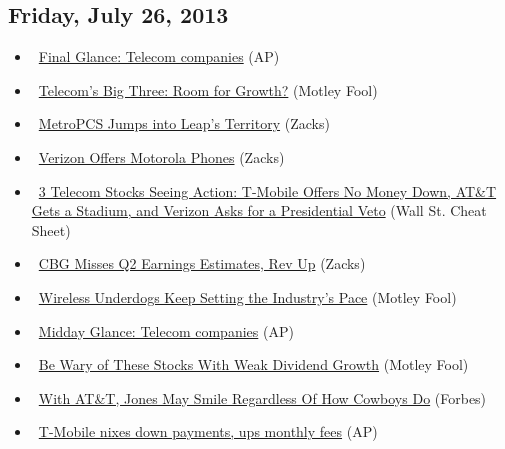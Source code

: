 \documentclass[11pt,asymmetric]{article}
\begin{document}
\subsection*{Friday, July 26, 2013}
\begin{itemize}
\item\ \href{http://finance.yahoo.com/news/final-glance-telecom-companies-220458936.html}{Final Glance: Telecom companies} (AP)
\item\ \href{http://beta.fool.com/billedson11/2013/07/26/telecoms-big-three-room-for-growth/41456/?source=eogyholnk0000001}{Telecom's Big Three: Room for Growth?} (Motley Fool)
\item\ \href{http://finance.yahoo.com/news/metropcs-jumps-leaps-territory-212002926.html}{MetroPCS Jumps into Leap's Territory} (Zacks)
\item\ \href{http://finance.yahoo.com/news/verizon-offers-motorola-phones-210112260.html}{Verizon Offers Motorola Phones} (Zacks)
\item\ \href{http://wallstcheatsheet.com/stocks/3-telecom-stocks-seeing-action-t-mobile-offers-no-money-down-att-gets-a-stadium-and-verizon-asks-for-a-presidential-veto.html/?ref=YF}{3 Telecom Stocks Seeing Action: T-Mobile Offers No Money Down, AT\&T Gets a Stadium, and Verizon Asks for a Presidential Veto} (Wall St. Cheat Sheet)
\item\ \href{http://finance.yahoo.com/news/cbg-misses-q2-earnings-estimates-185002541.html}{CBG Misses Q2 Earnings Estimates, Rev Up} (Zacks)
\item\ \href{http://www.fool.com/investing/general/2013/07/26/wireless-underdogs-keep-setting-the-industrys-pace.aspx?source=eogyholnk0000001}{Wireless Underdogs Keep Setting the Industry's Pace} (Motley Fool)
\item\ \href{http://finance.yahoo.com/news/midday-glance-telecom-companies-174214687.html}{Midday Glance: Telecom companies} (AP)
\item\ \href{http://beta.fool.com/jgp331/2013/07/26/watch-out-for-these-stocks-that-are-slowing-divide/41370/?source=eogyholnk0000001}{Be Wary of These Stocks With Weak Dividend Growth} (Motley Fool)
\item\ \href{http://www.forbes.com/sites/dalebuss/2013/07/26/with-att-jones-may-smile-regardless-of-how-cowboys-do/?partner=yahootix}{With AT\&T, Jones May Smile Regardless Of How Cowboys Do} (Forbes)
\item\ \href{http://finance.yahoo.com/news/t-mobile-nixes-down-payments-151227918.html}{T-Mobile nixes down payments, ups monthly fees} (AP)

\end{itemize}
\end{document}
